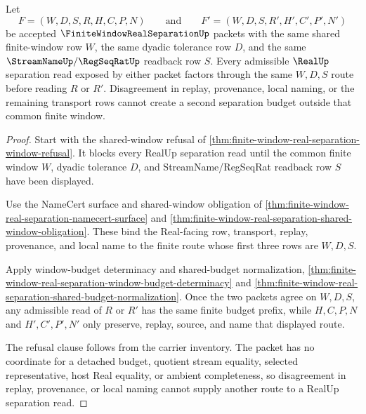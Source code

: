 \begin{theorem}
\label{thm:finite-window-real-separation-common-window-exactness}
Let
$$
F=(W,D,S,R,H,C,P,N)
\qquad\text{and}\qquad
F'=(W,D,S,R',H',C',P',N')
$$
be accepted $\FiniteWindowRealSeparationUp$ packets with the same shared finite-window row $W$, the same dyadic tolerance row $D$, and the same $\StreamNameUp/\RegSeqRatUp$ readback row $S$. Every admissible $\RealUp$ separation read exposed by either packet factors through the same $W,D,S$ route before reading $R$ or $R'$. Disagreement in replay, provenance, local naming, or the remaining transport rows cannot create a second separation budget outside that common finite window.
\end{theorem}
\begin{proof}
Start with the shared-window refusal of \autoref{thm:finite-window-real-separation-window-refusal}. It blocks every RealUp separation read until the common finite window $W$, dyadic tolerance $D$, and StreamName/RegSeqRat readback row $S$ have been displayed.

Use the NameCert surface and shared-window obligation of \autoref{thm:finite-window-real-separation-namecert-surface} and \autoref{thm:finite-window-real-separation-shared-window-obligation}. These bind the Real-facing row, transport, replay, provenance, and local name to the finite route whose first three rows are $W,D,S$.

Apply window-budget determinacy and shared-budget normalization, \autoref{thm:finite-window-real-separation-window-budget-determinacy} and \autoref{thm:finite-window-real-separation-shared-budget-normalization}. Once the two packets agree on $W,D,S$, any admissible read of $R$ or $R'$ has the same finite budget prefix, while $H,C,P,N$ and $H',C',P',N'$ only preserve, replay, source, and name that displayed route.

The refusal clause follows from the carrier inventory. The packet has no coordinate for a detached budget, quotient stream equality, selected representative, host Real equality, or ambient completeness, so disagreement in replay, provenance, or local naming cannot supply another route to a RealUp separation read.
\end{proof}

